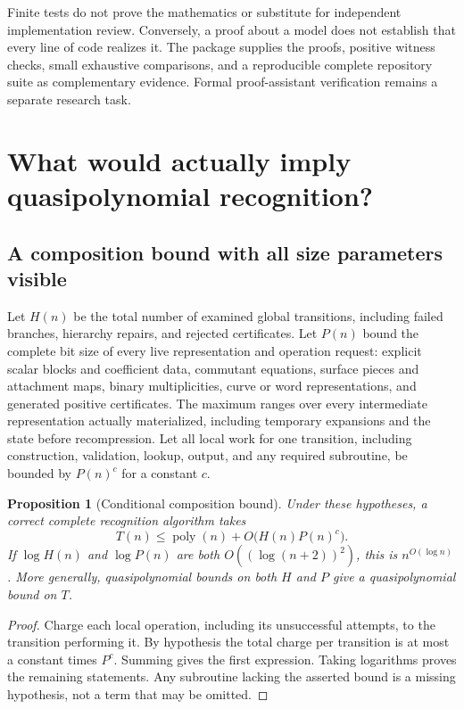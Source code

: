 \documentclass[11pt,a4paper]{article}
\newtheorem{proposition}[theorem]{Proposition}
\theoremstyle{definition}\newtheorem{definition}[theorem]{Definition}
\theoremstyle{remark}\newtheorem{remark}[theorem]{Remark}
\newcommand{\poly}{\operatorname{poly}}
\begin{document}
Finite tests do not prove the mathematics or substitute for independent
implementation review. Conversely, a proof about a model does not establish
that every line of code realizes it. The package supplies the proofs,
positive witness checks, small exhaustive comparisons, and a reproducible
complete repository suite as complementary evidence. Formal proof-assistant
verification remains a separate research task.

\section{What would actually imply quasipolynomial recognition?}
\label{sec:global}

\subsection{A composition bound with all size parameters visible}

Let $H(n)$ be the total number of examined global transitions, including
failed branches, hierarchy repairs, and rejected certificates. Let $P(n)$
bound the complete bit size of every live representation and operation
request: explicit scalar blocks and coefficient data, commutant equations,
surface pieces and attachment maps, binary multiplicities, curve or word
representations, and generated positive certificates. The maximum ranges
over every intermediate representation actually materialized, including
temporary expansions and the state before recompression. Let all local
work for one transition, including
construction, validation, lookup, output, and any required subroutine, be
bounded by $P(n)^c$ for a constant $c$.

\begin{proposition}[Conditional composition bound]
\label{prop:global}
Under these hypotheses, a correct complete recognition algorithm takes
\[
 T(n)\le\poly(n)+O\bigl(H(n)P(n)^c\bigr).
\]
If $\log H(n)$ and $\log P(n)$ are both
$O((\log(n+2))^2)$, this is $n^{O(\log n)}$.
More generally, quasipolynomial bounds on both $H$ and $P$ give a
quasipolynomial bound on $T$.
\end{proposition}
\begin{proof}
Charge each local operation, including its unsuccessful attempts, to the
transition performing it. By hypothesis the total charge per transition
is at most a constant times $P^c$. Summing gives the first expression.
Taking logarithms proves the remaining statements. Any subroutine lacking
the asserted bound is a missing hypothesis, not a term that may be omitted.
\end{proof}
\end{document}
